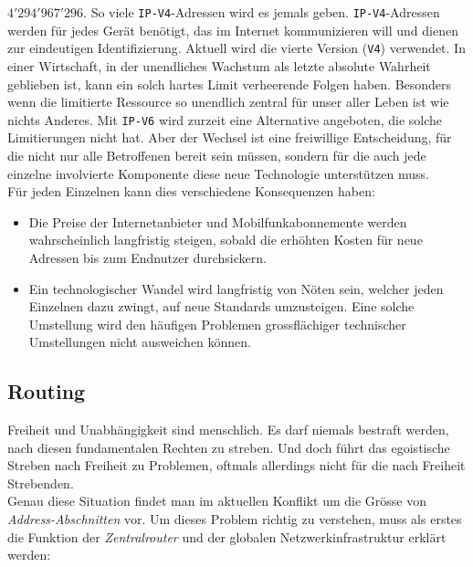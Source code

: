 \documentclass[a4paper,11pt,titlepage,twoside]{memoir}
\begin{document}
\noindent \(4'294'967'296\). So viele \texttt{IP-V4}-Adressen wird es jemals
geben. \texttt{IP-V4}-Adressen werden für jedes Gerät benötigt, das im Internet
kommunizieren will und dienen zur eindeutigen Identifizierung. Aktuell
wird die vierte Version (\texttt{V4}) verwendet. In einer Wirtschaft, in der
unendliches Wachstum als letzte absolute Wahrheit geblieben ist, kann
ein solch hartes Limit verheerende Folgen haben. Besonders wenn die
limitierte Ressource so unendlich zentral für unser aller Leben ist
wie nichts Anderes. Mit \texttt{IP-V6} wird zurzeit eine Alternative angeboten,
die solche Limitierungen nicht hat. Aber der Wechsel ist eine
freiwillige Entscheidung, für die nicht nur alle Betroffenen bereit
sein müssen, sondern für die auch jede einzelne involvierte Komponente
diese neue Technologie unterstützen muss.\\

\noindent Für jeden Einzelnen kann dies verschiedene Konsequenzen
haben:
\begin{itemize}
\item Die Preise der Internetanbieter und Mobilfunkabonnemente werden
wahrscheinlich langfristig steigen, sobald die erhöhten Kosten für
neue Adressen bis zum Endnutzer durchsickern.
\item Ein technologischer Wandel wird langfristig von Nöten sein, welcher
jeden Einzelnen dazu zwingt, auf neue Standards umzusteigen. Eine
solche Umstellung wird den häufigen Problemen grossflächiger
technischer Umstellungen nicht ausweichen können.
\end{itemize}
\subsection{Routing}
\label{sec:org60198f7}
Freiheit und Unabhängigkeit sind menschlich. Es darf niemals bestraft
werden, nach diesen fundamentalen Rechten zu streben. Und doch führt
das egoistische Streben nach Freiheit zu Problemen, oftmals allerdings
nicht für die nach Freiheit Strebenden.\\

\noindent Genau diese Situation findet man im aktuellen Konflikt um
die Grösse von \emph{Address-Abschnitten} vor. Um dieses Problem richtig zu
verstehen, muss als erstes die Funktion der \emph{Zentralrouter} und der
globalen Netzwerkinfrastruktur erklärt werden:\\
\end{document}

